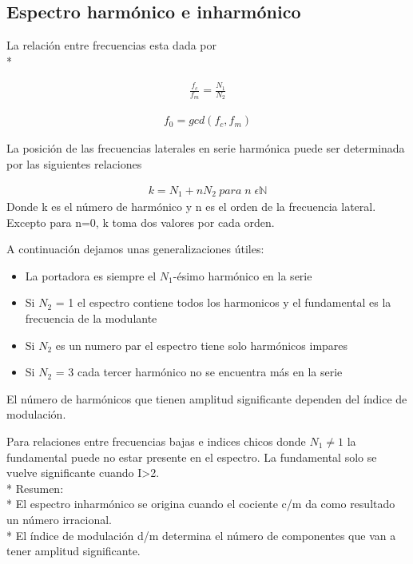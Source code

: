\documentclass[assd_tp2_main.tex]{subfiles}
\begin{document}
\subsection*{Espectro harmónico e inharmónico}
La relación entre frecuencias esta dada por \\*

\begin{eqnarray*}
\displaystyle \frac{f_c}{f_m}=\frac{N_1}{N_2} 
\end{eqnarray*}
 
\begin{eqnarray*}
\displaystyle f_0=gcd(f_c,f_m)
\end{eqnarray*}
 
La posición de las frecuencias laterales en serie harmónica puede ser determinada por las siguientes relaciones

\begin{eqnarray*}
\displaystyle k = N_1 + nN_2 \: para\; n\;\epsilon \mathbb{N}
\end{eqnarray*}
Donde k es el  número de harmónico y n es el orden de la frecuencia lateral.
Excepto para n=0, k toma dos valores por cada orden.

A continuación dejamos unas generalizaciones útiles:
\begin{itemize}
\item La portadora es siempre el $N_1$-ésimo harmónico  en la serie
\item Si $N_2$ = 1 el espectro contiene todos los harmonicos	y el fundamental es la frecuencia de la modulante
\item Si $N_2$ es un numero par el espectro tiene solo harmónicos impares
\item Si $N_2$ = 3 cada tercer harmónico no se encuentra más en la serie
\end{itemize}
 

El número de harmónicos que tienen amplitud significante  dependen del índice de modulación.

Para relaciones entre frecuencias bajas e indices chicos donde $N_1\neq1$ la fundamental puede no estar presente en el espectro.
La fundamental solo se vuelve significante cuando I>2.\\*
Resumen:\\*
El espectro inharmónico se origina cuando el cociente c/m da como resultado un número irracional. \\*
El índice de modulación d/m determina el número de componentes que van a tener amplitud significante.
\end{document}
